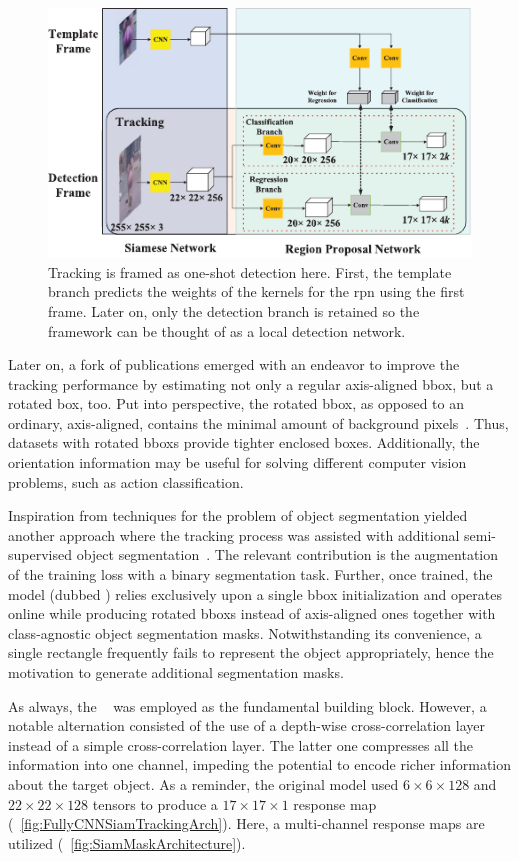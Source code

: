 \begin{figure}[t]
    \centerline{\includegraphics[width=0.7\linewidth]{figures/theoretical_foundations/siam_rpn_one_shot_detection.pdf}}
    \caption[Tracking as one-shot detection]{Tracking is framed as one-shot detection here. First, the template branch predicts the weights of the kernels for the \gls{rpn} using the first frame. Later on, only the detection branch is retained so the framework can be thought of as a local detection network. }
    \label{fig:SiamRPNOneShotDetection}
\end{figure}

Later on, a fork of publications emerged with an endeavor to improve the tracking performance by estimating not only a regular axis-aligned \gls{bbox}, but a rotated box, too. Put into perspective, the rotated \gls{bbox}, as opposed to an ordinary, axis-aligned, contains the minimal amount of background pixels~\cite{chen2019rotbboxes}. Thus, datasets with rotated \glspl{bbox} provide tighter enclosed boxes. Additionally, the orientation information may be useful for solving different computer vision problems, such as action classification.

Inspiration from techniques for the problem of object segmentation yielded another approach where the tracking process was assisted with additional semi-supervised object segmentation~\cite{wang2019siammask}. The relevant contribution is the augmentation of the training loss with a binary segmentation task. Further, once trained, the model (dubbed \siammask{}) relies exclusively upon a single \gls{bbox} initialization and operates online while producing rotated \glspl{bbox} instead of axis-aligned ones together with class-agnostic object segmentation masks. Notwithstanding its convenience, a single rectangle frequently fails to represent the object appropriately, hence the motivation to generate additional segmentation masks.

As always, the \siamfc{}~\cite{bertinetto2016siamfc} was employed as the fundamental building block. However, a notable alternation consisted of the use of a depth-wise cross-correlation layer instead of a simple cross-correlation layer. The latter one compresses all the information into one channel, impeding the potential to encode richer information about the target object. As a reminder, the original model used $6 \times 6 \times 128$ and $22 \times 22 \times 128$ tensors to produce a $17 \times 17 \times 1$ response map (\figstr{}~\ref{fig:FullyCNNSiamTrackingArch}). Here, a multi-channel response maps are utilized (\figstr{}~\ref{fig:SiamMaskArchitecture}).

